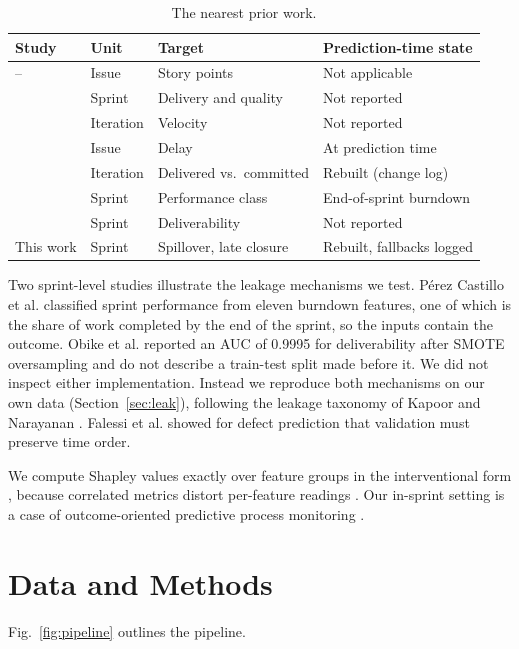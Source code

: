 \documentclass[conference]{IEEEtran}
\begin{document}
\begin{table}[!t]
\centering\scriptsize
\caption{The nearest prior work.}
\label{tab:related}
\setlength{\tabcolsep}{3pt}
\begin{tabular}{llll}
\hline
Study & Unit & Target & Prediction-time state\\
\hline
\cite{r1}--\cite{r3} & Issue & Story points & Not applicable\\
\cite{r4} & Sprint & Delivery and quality & Not reported\\
\cite{r5} & Iteration & Velocity & Not reported\\
\cite{r25} & Issue & Delay & At prediction time\\
\cite{r19} & Iteration & Delivered vs.\ committed & Rebuilt (change log)\\
\cite{r7} & Sprint & Performance class & End-of-sprint burndown\\
\cite{r8} & Sprint & Deliverability & Not reported\\
This work & Sprint & Spillover, late closure & Rebuilt, fallbacks logged\\
\hline
\end{tabular}
\end{table}

Two sprint-level studies illustrate the leakage mechanisms we test. Pérez Castillo et al. \cite{r7} classified sprint performance from eleven burndown features, one of which is the share of work completed by the end of the sprint, so the inputs contain the outcome. Obike et al. \cite{r8} reported an AUC of 0.9995 for deliverability after SMOTE oversampling \cite{r15} and do not describe a train-test split made before it. We did not inspect either implementation. Instead we reproduce both mechanisms on our own data (Section~\ref{sec:leak}), following the leakage taxonomy of Kapoor and Narayanan \cite{r21}. Falessi et al. \cite{r24} showed for defect prediction that validation must preserve time order.

We compute Shapley values \cite{r9} exactly over feature groups in the interventional form \cite{r23}, because correlated metrics distort per-feature readings \cite{r11}. Our in-sprint setting is a case of outcome-oriented predictive process monitoring \cite{r12, r13}.

\section{Data and Methods}

Fig.~\ref{fig:pipeline} outlines the pipeline.
\end{document}
